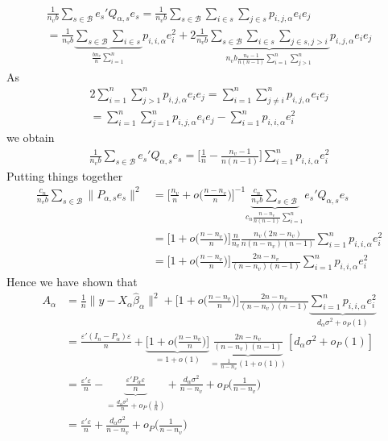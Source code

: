 \documentclass[Research_Module_ES.tex]{subfiles}
\begin{document}
\begin{align*}
\frac{1}{n_vb}\sum_{s\in \mathcal{B}}e_s'Q_{\alpha,s}e_s
 = \frac{1}{n_vb}\sum_{s\in \mathcal{B}} \sum_{i\in s}\sum_{j\in s}p_{i,j,\alpha}e_ie_j\\
=\frac{1}{n_vb}\underbrace{\sum_{s\in \mathcal{B}} \sum_{i\in s}}_{\frac{bn_v}{n}\sum_{i=1}^n} p_{i,i,\alpha}e_i^2 + 2\frac{1}{n_vb}\underbrace{\sum_{s\in \mathcal{B}} \sum_{i\in s}\sum_{j\in s, j>i }}_{n_vb\frac{n_v-1}{n(n-1)}\sum_{i=1}^n\sum_{j>1}^n} p_{i,j,\alpha}e_ie_j
\end{align*}
As
\begin{align*}
2\sum_{i=1}^n\sum_{j>1}^np_{i,j,\alpha}e_ie_j= \sum_{i=1}^n\sum_{j\neq i}^np_{i,j,\alpha}e_ie_j \\
= \sum_{i=1}^n\sum_{j=1}^np_{i,j,\alpha}e_ie_j - \sum_{i=1}^np_{i,i,\alpha}e_i^2
\end{align*}
we obtain
\begin{align*}
\frac{1}{n_vb}\sum_{s\in \mathcal{B}}e_s'Q_{\alpha,s}e_s=\biggl[\frac{1}{n}-\frac{n_v-1}{n(n-1)}\biggr] \sum_{i=1}^np_{i,i,\alpha}e_i^2
\end{align*}
Putting things together
\begin{align*}
\frac{c_n}{n_vb}\sum_{s\in \mathcal{B}}\lVert P_{\alpha,s}e_s\rVert^2
&= \biggl[\frac{n_v}{n}+o\biggl(\frac{n-n_v}{n}\biggr)\biggr]^{-1}\underbrace{\frac{c_n}{n_vb}\sum_{s\in \mathcal{B}}}_{c_n\frac{n-n_v}{n(n-1)}\sum_{i=1}^n}e_s'Q_{\alpha,s}e_s\\ 
&=  \biggl[1+o\biggl(\frac{n-n_v}{n}\biggr)\biggr]\frac{n}{n_v}\frac{n_v(2n-n_v)}{n(n-n_v)(n-1)} \sum_{i=1}^np_{i,i,\alpha}e_i^2\\
&=\biggl[1+o\biggl(\frac{n-n_v}{n}\biggr)\biggr]\frac{2n-n_v}{(n-n_v)(n-1)} \sum_{i=1}^np_{i,i,\alpha}e_i^2
\end{align*}
Hence we have shown that
\begin{align*}
A_\alpha&= \frac{1}{n}\lVert y-X_\alpha\hat{\beta}_\alpha\rVert^2 + \biggl[1+o\biggl(\frac{n-n_v}{n}\biggr)\biggr]\frac{2n-n_v}{(n-n_v)(n-1)} \underbrace{\sum_{i=1}^np_{i,i,\alpha}e_i^2}_{d_\alpha\sigma^2+o_P(1)}\\
&= \frac{\varepsilon'(I_n-P_\alpha)\varepsilon}{n} +\underbrace{\biggl[1+o\biggl(\frac{n-n_v}{n}\biggr)\biggr]}_{=1+o(1)}\underbrace{\frac{2n-n_v}{(n-n_v)(n-1)}}_{=\frac{1}{n-n_v}(1+o(1))} [d_\alpha\sigma^2+o_P(1)]\\
&=\frac{\varepsilon'\varepsilon }{n}- \underbrace{\frac{\varepsilon'P_\alpha\varepsilon}{n}}_{=\frac{d_\alpha\sigma^2}{n}+o_P(\frac{1}{n})} + \frac{d_\alpha\sigma^2}{n-n_v}+o_P\biggl(\frac{1}{n-n_v}\biggr)\\
&=\frac{\varepsilon'\varepsilon }{n}+\frac{d_\alpha\sigma^2}{n-n_v}+o_P\biggl(\frac{1}{n-n_v}\biggr)
\end{align*}
\end{document}
